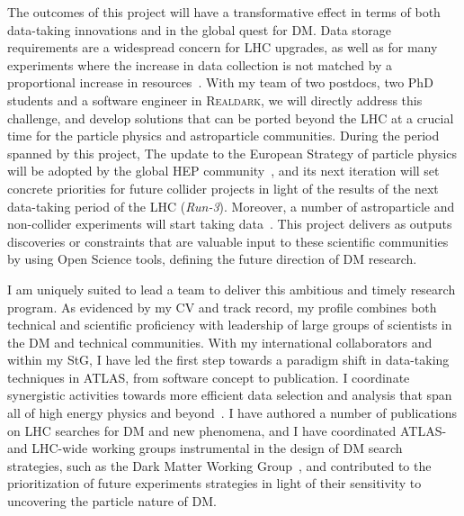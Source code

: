 \documentclass[11pt,a4paper]{article}
\begin{document}
The outcomes of this project will have a transformative effect in terms of both data-taking innovations and in the global quest for DM. 
Data storage requirements are a widespread concern for LHC upgrades, as well as for many experiments where the increase in data collection is not matched by a proportional increase in resources~\cite{Alves:2017she,Allen:2018yvz}. 
With my team of two postdocs, two PhD students and a software engineer in \textsc{Realdark}, we will directly address this challenge, and develop solutions that can be ported beyond the LHC at a crucial time for the particle physics and astroparticle communities.  
During the period spanned by this project, 
The update to the European Strategy of particle physics will be adopted by the global HEP community~\cite{Strategy:2019vxc}, and its next iteration will set concrete priorities for future collider projects in light of the results of the next data-taking period of the LHC (\textit{Run-3}).
Moreover, a number of astroparticle and non-collider experiments will start taking data~\cite{APPECStrategy,Beacham:2019nyx}. 
This project delivers as outputs discoveries or constraints that are valuable input to these scientific communities by using Open Science tools, defining the future direction of DM research. 

I am uniquely suited to lead a team to deliver this ambitious and timely research program.  
As evidenced by my CV and track record, my profile combines both technical and scientific proficiency with leadership of large groups of scientists in the DM and technical communities. 
With my international collaborators and within my StG, I have led the first step towards a paradigm shift in data-taking techniques in ATLAS, from software concept to publication. 
I coordinate synergistic activities towards more efficient data selection and analysis that span all of high energy physics and beyond~\cite{Alves:2017she}. 
I have authored a number of publications on LHC searches for DM and new phenomena, and I have coordinated ATLAS- and LHC-wide working groups instrumental in the design of DM search strategies, such as the Dark Matter Working Group~\cite{DMWGWebsite}, and contributed to the prioritization of future experiments strategies in light of their sensitivity to uncovering the particle nature of DM. 
\end{document}
